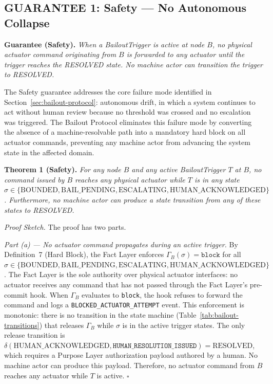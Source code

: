 \documentclass[12pt]{article}
\begin{document}
\subsection{GUARANTEE 1: Safety — No Autonomous Collapse}
\label{sec:guarantee-safety}

\bigskip

\begin{minipage}{\textwidth}
\textbf{Guarantee (Safety).} \textit{When a BailoutTrigger is active at node $B$, no physical actuator command originating from $B$ is forwarded to any actuator until the trigger reaches the RESOLVED state. No machine actor can transition the trigger to RESOLVED.}
\end{minipage}

\bigskip

The Safety guarantee addresses the core failure mode identified in Section~\ref{sec:bailout-protocol}: autonomous drift, in which a system continues to act without human review because no threshold was crossed and no escalation was triggered. The Bailout Protocol eliminates this failure mode by converting the absence of a machine-resolvable path into a mandatory hard block on all actuator commands, preventing any machine actor from advancing the system state in the affected domain.

\bigskip

\noindent\textbf{Theorem 1 (Safety).}
\textit{For any node $B$ and any active BailoutTrigger $T$ at $B$, no command issued by $B$ reaches any physical actuator while $T$ is in any state $\sigma \in \{\text{BOUNDED}, \text{BAIL\_PENDING}, \text{ESCALATING}, \text{HUMAN\_ACKNOWLEDGED}\}$. Furthermore, no machine actor can produce a state transition from any of these states to RESOLVED.}

\bigskip

\noindent\textit{Proof Sketch.} The proof has two parts.

\bigskip

\noindent\textit{Part (a) — No actuator command propagates during an active trigger.} By Definition~7 (Hard Block), the Fact Layer enforces $\Gamma_B(\sigma) = \texttt{block}$ for all $\sigma \in \{\text{BOUNDED}, \text{BAIL\_PENDING}, \text{ESCALATING}, \text{HUMAN\_ACKNOWLEDGED}\}$. The Fact Layer is the sole authority over physical actuator interfaces: no actuator receives any command that has not passed through the Fact Layer's pre-commit hook. When $\Gamma_B$ evaluates to \texttt{block}, the hook refuses to forward the command and logs a \texttt{BLOCKED\_ACTUATOR\_ATTEMPT} event. This enforcement is monotonic: there is no transition in the state machine (Table~\ref{tab:bailout-transitions}) that releases $\Gamma_B$ while $\sigma$ is in the active trigger states. The only release transition is $\delta(\text{HUMAN\_ACKNOWLEDGED}, \texttt{HUMAN\_RESOLUTION\_ISSUED}) = \text{RESOLVED}$, which requires a Purpose Layer authorization payload authored by a human. No machine actor can produce this payload. Therefore, no actuator command from $B$ reaches any actuator while $T$ is active. $\square$
\end{document}
